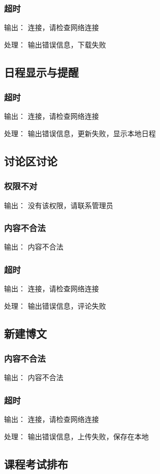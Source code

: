 \subsubsection{超时}
输出： 连接，请检查网络连接

处理： 输出错误信息，下载失败

\subsection{日程显示与提醒}
\subsubsection{超时}
输出： 连接，请检查网络连接

处理： 输出错误信息，更新失败，显示本地日程

\subsection{讨论区讨论}
\subsubsection{权限不对}
输出： 没有该权限，请联系管理员
\subsubsection{内容不合法}
输出： 内容不合法
\subsubsection{超时}
输出： 连接，请检查网络连接

处理： 输出错误信息，评论失败

\subsection{新建博文}
\subsubsection{内容不合法}
输出： 内容不合法
\subsubsection{超时}
输出： 连接，请检查网络连接

处理： 输出错误信息，上传失败，保存在本地

\subsection{课程考试排布}
